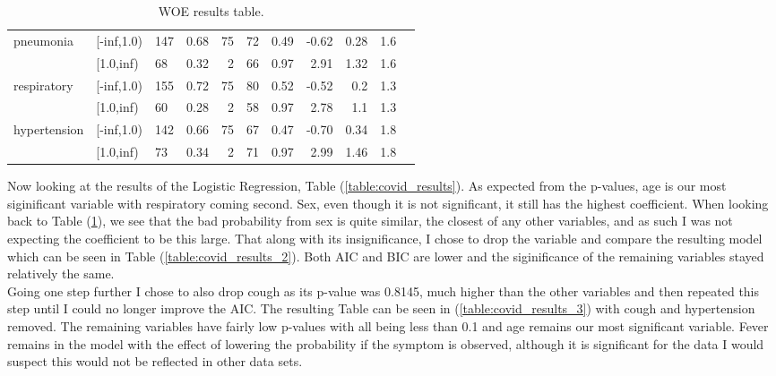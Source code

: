 \begin{table}[H]
\begin{tabular}{lllrrrrrrrr}
		\midrule
		 pneumonia &  [-inf,1.0) &    147 &         0.68 &    75 &   72 &     0.49 & -0.62 &    0.28 &       1.6 \\
  		&   [1.0,inf) &     68 &         0.32 &     2 &   66 &     0.97 &  2.91 &    1.32 &       1.6 \\
		\midrule
		respiratory  &  [-inf,1.0) &    155 &         0.72 &    75 &   80 &     0.52 & -0.52 &     0.2 &       1.3 \\
   		&   [1.0,inf) &     60 &         0.28 &     2 &   58 &     0.97 &  2.78 &     1.1 &       1.3 \\
		\midrule
		hypertension &  [-inf,1.0) &    142 &         0.66 &    75 &   67 &     0.47 & -0.70 &    0.34 &       1.8 \\
  		&   [1.0,inf) &     73 &         0.34 &     2 &   71 &     0.97 &  2.99 &    1.46 &       1.8 \\
		\bottomrule
	\end{tabular}
	\caption{WOE results table. \label{table:covid_woe}}
\end{table}

Now looking at the results of the Logistic Regression, Table (\ref{table:covid_results}). As expected from the p-values, age is our most siginificant variable with respiratory coming second. Sex, even though it is not significant, it still has the highest coefficient. When looking back to Table (\ref{table:covid_woe}), we see that the bad probability from sex is quite similar, the closest of any other variables, and as such I was not expecting the coefficient to be this large. That along with its insignificance, I chose to drop the variable and compare the resulting model which can be seen in Table (\ref{table:covid_results_2}). Both AIC and BIC are lower and the siginificance of the remaining variables stayed relatively the same. \\

Going one step further I chose to also drop cough as its p-value was 0.8145, much higher than the other variables and then repeated this step until I could no longer improve the AIC. The resulting Table can be seen in (\ref{table:covid_results_3}) with cough and hypertension removed. The remaining variables have fairly low p-values with all being less than 0.1 and age remains our most significant variable. Fever remains in the model with the effect of lowering the probability if the symptom is observed, although it is significant for the data I would suspect this would not be reflected in other data sets. \\

